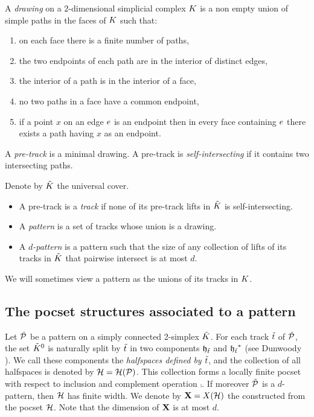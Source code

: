 \begin{definition}
	A  \emph{drawing} on a $2$-dimensional simplicial complex $K$ is a non empty union of simple paths in the faces of $K$ such that:
	\begin{enumerate}
		\item on each face there is a finite number of paths,
		\item the two endpoints of each path are in the interior of distinct edges,
		\item the interior of a path is in the interior of a face,
		\item no two paths in a face have a common endpoint,
		\item if a point $x$ on an edge $e$ is an endpoint then in every face containing $e$ there exists a path having $x$ as an endpoint.
	\end{enumerate}
	
	A \emph{pre-track} is a minimal drawing. A pre-track is \emph{self-intersecting} if it contains two intersecting paths.
	
	Denote by $\tilde{K}$ the universal cover.
	
	\begin{itemize}
		\item A pre-track is a \emph{track} if none of its pre-track lifts in $\tilde{K}$ is self-intersecting.
		\item A \emph{pattern} is a set of tracks whose union is a drawing.
		\item A \emph{$d$-pattern} is a pattern such that the size of any collection of lifts of its tracks in $\tilde{K}$ that pairwise intersect is at most $d$.
	\end{itemize}
\end{definition}

We will sometimes view a pattern as the unions of its tracks in $K$.

\subsection{The pocset structures associated to a pattern}\label{pocset} 

Let ${\tilde{\mathcal{P}}}$ be a pattern on a simply connected 2-simplex $\tilde{K}$.
For each track ${\tilde{t}}$ of ${\tilde{\mathcal{P}}}$, the set $\tilde{K}^0$ is naturally split by ${\tilde{t}}$ in two components  $\mathfrak{h}_{{\tilde{t}}}$ and ${\mathfrak{h}_{{\tilde{t}}}}^*$ (see Dunwoody \cite{Dun85}). 
We call these components the \emph{halfspaces defined by ${\tilde{t}}$}, and the collection of all halfspaces is denoted by $\mathcal{H}=\mathcal{H}({\mathcal{P}})$. 
This collection forms a locally finite pocset with respect to inclusion and complement operation $\comp{}$. 
If moreover ${\tilde{\mathcal{P}}}$ is a $d$-pattern, then $\mathcal{H}$ has finite width. We denote by $\mathbf{X}=X(\mathcal{H})$ the \CCC constructed from the pocset $\mathcal{H}$. 
Note that the dimension of $\mathbf{X}$ is at most $d$. 

